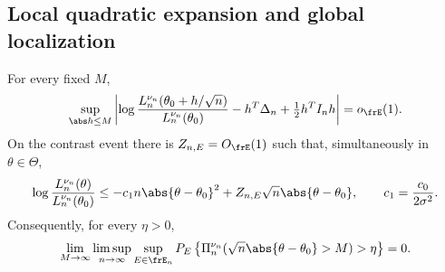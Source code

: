 \subsection{Local quadratic expansion and global localization}

\begin{proposition}
\label{prop:local-global}
For every fixed \(M\),
\begin{equation}
 \sup_{\abs h\le M}
 \left|
 \log\frac{L_n^{\nu_n}(\theta_0+h/\sqrt n)}
           {L_n^{\nu_n}(\theta_0)}
 -h^T\Delta_n+\tfrac12h^TI_nh
 \right|=o_{\frE}(1).
 \label{eq:uniform-lan}
\end{equation}
On the contrast event there is \(Z_{n,E}=O_{\frE}(1)\) such that,
simultaneously in \(\theta\in\Theta\),
\begin{equation}
 \log\frac{L_n^{\nu_n}(\theta)}{L_n^{\nu_n}(\theta_0)}
 \le-c_1n\abs{\theta-\theta_0}^2
       +Z_{n,E}\sqrt n\abs{\theta-\theta_0},
 \qquad c_1=\frac{c_0}{2\sigma^2}.
 \label{eq:global-envelope}
\end{equation}
Consequently, for every \(\eta>0\),
\begin{equation}
 \lim_{M\to\infty}\limsup_{n\to\infty}
 \sup_{E\in\frE_n}
 P_E\left\{
 \Pi_n^{\nu_n}(\sqrt n\abs{\theta-\theta_0}>M)>\eta
 \right\}=0.
 \label{eq:root-n-contraction}
\end{equation}
\end{proposition}

